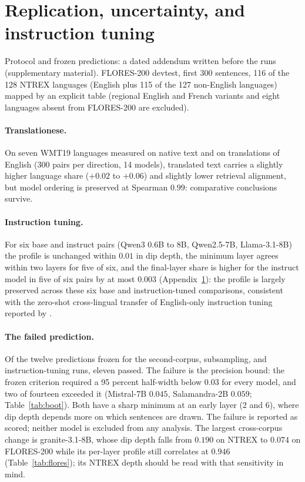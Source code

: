 \documentclass{article} %
\begin{document}
\section{Replication, uncertainty, and instruction tuning}
\label{app:replication}
Protocol and frozen predictions: a dated addendum written before the runs
(supplementary material). FLORES-200 devtest, first 300 sentences, 116 of the
128 NTREX languages (English plus 115 of the 127 non-English languages) mapped by an explicit table (regional English and French
variants and eight languages absent from FLORES-200 are excluded).

\paragraph{Translationese.} On seven WMT19 languages measured on native text and on translations of English (300 pairs per direction, 14 models), translated text carries a slightly higher language share ($+0.02$ to $+0.06$) and slightly lower retrieval alignment, but model ordering is preserved at Spearman $0.99$: comparative conclusions survive.

\paragraph{Instruction tuning.} For six base and instruct pairs (Qwen3 0.6B to 8B, Qwen2.5-7B, Llama-3.1-8B) the profile is unchanged within $0.01$ in dip depth, the minimum layer agrees within two layers for five of six, and the final-layer share is higher for the instruct model in five of six pairs by at most $0.003$ (Appendix~\ref{app:replication}): the profile is largely preserved across these six base and instruction-tuned comparisons, consistent with the zero-shot cross-lingual transfer of English-only instruction tuning reported by \citet{chirkova2024zeroshot}.
\paragraph{The failed prediction.} Of the twelve predictions frozen for the second-corpus, subsampling, and instruction-tuning runs, eleven passed. The failure is the precision bound: the frozen criterion required a 95 percent half-width below $0.03$ for every model, and two of fourteen exceeded it (Mistral-7B $0.045$, Salamandra-2B $0.059$; Table~\ref{tab:boot}). Both have a sharp minimum at an early layer (2 and 6), where dip depth depends more on which sentences are drawn. The failure is reported as scored; neither model is excluded from any analysis. The largest cross-corpus change is granite-3.1-8B, whose dip depth falls from $0.190$ on NTREX to $0.074$ on FLORES-200 while its per-layer profile still correlates at $0.946$ (Table~\ref{tab:flores}); its NTREX depth should be read with that sensitivity in mind.
\end{document}
